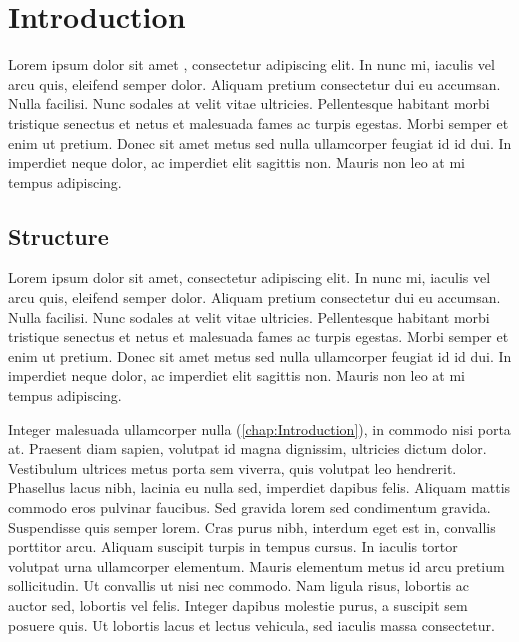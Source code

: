 

\chapter{Introduction}
\label{chap:Introduction}
\PartialToc %

Lorem ipsum dolor sit amet \cite{Name2014}, consectetur adipiscing elit. In nunc mi, iaculis vel arcu quis, eleifend semper dolor. Aliquam pretium consectetur dui eu accumsan. Nulla facilisi. Nunc sodales at velit vitae ultricies. Pellentesque habitant morbi tristique senectus et netus et malesuada fames ac turpis egestas. Morbi semper et enim ut pretium. Donec sit amet metus sed nulla ullamcorper feugiat id id dui. In imperdiet neque dolor, ac imperdiet elit sagittis non. Mauris non leo at mi tempus adipiscing.


\section{Structure}

 Lorem ipsum dolor sit amet, consectetur adipiscing elit. In nunc mi, iaculis vel arcu quis, eleifend semper dolor. Aliquam pretium consectetur dui eu accumsan. Nulla facilisi. Nunc sodales at velit vitae ultricies. Pellentesque habitant morbi tristique senectus et netus et malesuada fames ac turpis egestas. Morbi semper et enim ut pretium. Donec sit amet metus sed nulla ullamcorper feugiat id id dui. In imperdiet neque dolor, ac imperdiet elit sagittis non. Mauris non leo at mi tempus adipiscing.

Integer malesuada ullamcorper nulla (\autoref{chap:Introduction}), in commodo nisi porta at. Praesent diam sapien, volutpat id magna dignissim, ultricies dictum dolor. Vestibulum ultrices metus porta sem viverra, quis volutpat leo hendrerit. Phasellus lacus nibh, lacinia eu nulla sed, imperdiet dapibus felis. Aliquam mattis commodo eros pulvinar faucibus. Sed gravida lorem sed condimentum gravida. Suspendisse quis semper lorem. Cras purus nibh, interdum eget est in, convallis porttitor arcu. Aliquam suscipit turpis in tempus cursus. In iaculis tortor volutpat urna ullamcorper elementum. Mauris elementum metus id arcu pretium sollicitudin. Ut convallis ut nisi nec commodo. Nam ligula risus, lobortis ac auctor sed, lobortis vel felis. Integer dapibus molestie purus, a suscipit sem posuere quis. Ut lobortis lacus et lectus vehicula, sed iaculis massa consectetur.

